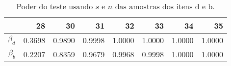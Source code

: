 \begin{table}[ht]
\centering
\caption{Poder do teste usando $s$ e $n$ das amostras dos itens d e b.} 
\label{tb:1d}
\begin{tabular}{rrrrrrrr}
  \toprule
 & 28 & 30 & 31 & 32 & 33 & 34 & 35 \\ 
  \midrule
$\beta_d$ & 0.3698 & 0.9890 & 0.9998 & 1.0000 & 1.0000 & 1.0000 & 1.0000 \\ 
  $\beta_b$ & 0.2207 & 0.8359 & 0.9679 & 0.9968 & 0.9998 & 1.0000 & 1.0000 \\ 
   \bottomrule
\end{tabular}
\end{table}
